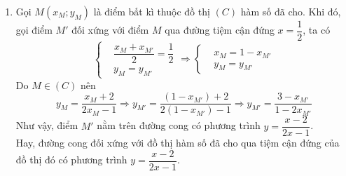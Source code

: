 \begin{bt}
{\begin{enumerate}
\begin{itemize}
\begin{center}
				\end{center}
			\end{itemize}
			\item 
			Gọi $ M\left(x_M;y_M\right) $ là điểm bất kì thuộc đồ thị $(C)$ hàm số đã cho. Khi đó, gọi điểm $M'$ đối xứng với điểm $M$ qua đường tiệm cận đứng $x=\dfrac{1}{2}$, ta có 
			$$ \left\{\begin{aligned}
			&\dfrac{x_M+x_{M'}}{2}=\dfrac{1}{2}\\
			&y_M=y_{M'}
			\end{aligned}\right. 
			\Rightarrow  \left\{\begin{aligned}
			&x_M=1-x_{M'}\\
			&y_M=y_{M'}
			\end{aligned}\right.$$
			Do $M\in (C)$ nên
			$$y_M=\dfrac{x_M+2}{2x_M-1} \Rightarrow y_{M'}=\dfrac{(1-x_{M'})+2}{2(1-x_{M'})-1}\Rightarrow y_{M'}=\dfrac{3-x_{M'}}{1-2x_{M'}}$$
			Như vậy, điểm $M'$ nằm trên đường cong có phương trình $ y=\dfrac{x-2}{2x-1} $.\\
			Hay, đường cong đối xứng với đồ thị hàm số đã cho qua tiệm cận đứng của đồ thị đó có phương trình $ y=\dfrac{x-2}{2x-1} $.
		\end{enumerate}
	}
\end{bt}

